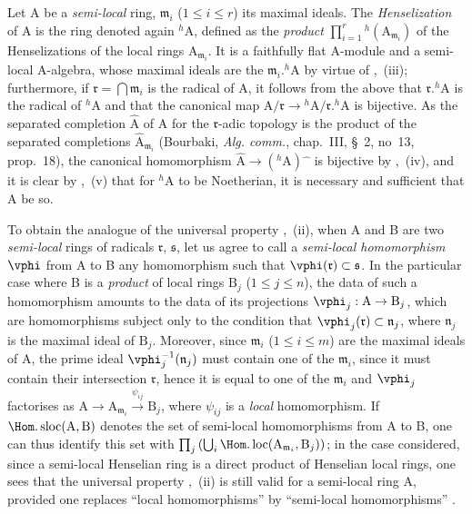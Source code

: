 \begin{env}[18.6.7]
\label{IV.18.6.7}
Let A be a \emph{semi-local} ring, $\mathfrak{m}_i$ ($1\leq i\leq r$) its maximal ideals.
The \emph{Henselization} of A is the ring denoted again ${}^h\!\mathrm{A}$, defined as the \emph{product} $\prod_{i=1}^r{}^h(\mathrm{A}_{\mathfrak{m}_i})$ of the Henselizations of the local rings $\mathrm{A}_{\mathfrak{m}_i}$.
It is a faithfully flat A-module and a semi-local A-algebra, whose maximal ideals are the $\mathfrak{m}_i.{}^h\!\mathrm{A}$ by virtue of ,~(iii);
furthermore, if $\mathfrak{r}=\bigcap\mathfrak{m}_i$ is the radical of A, it follows from the above that $\mathfrak{r}.{}^h\!\mathrm{A}$
is the radical of ${}^h\!\mathrm{A}$ and that the canonical map $\mathrm{A}/\mathfrak{r}\to{}^h\!\mathrm{A}/\mathfrak{r}.{}^h\!\mathrm{A}$ is bijective.
As the separated completion $\hat{\mathrm{A}}$ of A for the $\mathfrak{r}$-adic topology is the product of the separated completions $\hat{\mathrm{A}}_{\mathfrak{m}_i}$ (Bourbaki, \emph{Alg. comm.}, chap.~III, \S~2, no~13, prop.~18), the canonical homomorphism $\hat{\mathrm{A}}\to({}^h\!\mathrm{A})\hat{\phantom{x}}$ is bijective by ,~(iv), and it is clear by ,~(v) that for ${}^h\!\mathrm{A}$ to be Noetherian, it is necessary and sufficient that A be so.

To obtain the analogue of the universal property ,~(ii), when A and B are two \emph{semi-local} rings of radicals $\mathfrak{r}$, $\mathfrak{s}$, let us agree to call a \emph{semi-local homomorphism} $\vphi$ from A to B any homomorphism such that $\vphi(\mathfrak{r})\subset\mathfrak{s}$.
In the particular case where B is a \emph{product} of local rings $\mathrm{B}_j$ ($1\leq j\leq n$), the data of such a homomorphism amounts to the data of its projections $\vphi_j:\mathrm{A}\to\mathrm{B}_j$, which are homomorphisms subject only to the condition that $\vphi_j(\mathfrak{r})\subset\mathfrak{n}_j$, where $\mathfrak{n}_j$ is the maximal ideal of $\mathrm{B}_j$.
Moreover, since $\mathfrak{m}_i$ ($1\leq i\leq m$) are the maximal ideals of A, the prime ideal $\vphi_j^{-1}(\mathfrak{n}_j)$ must contain one of the $\mathfrak{m}_i$, since it must contain their intersection $\mathfrak{r}$, hence it is equal to one of the $\mathfrak{m}_i$ and $\vphi_j$ factorises as $\mathrm{A}\to\mathrm{A}_{\mathfrak{m}_i}\xrightarrow{\psi_{ij}}\mathrm{B}_j$, where $\psi_{ij}$ is a \emph{local} homomorphism.
If $\Hom.\operatorname{sloc}(\mathrm{A},\mathrm{B})$ denotes the set of semi-local homomorphisms from A to B, one can thus identify this set with $\prod_j\left(\bigcup_i\Hom.\operatorname{loc}(\mathrm{A}_{\mathfrak{m}_i},\mathrm{B}_j)\right)$;
in the case considered, since a semi-local Henselian ring is a direct product of Henselian local rings, one sees that the universal property ,~(ii) is still valid for a semi-local ring A, provided one replaces ``local homomorphisms'' by ``semi-local homomorphisms'' .
\end{env}

